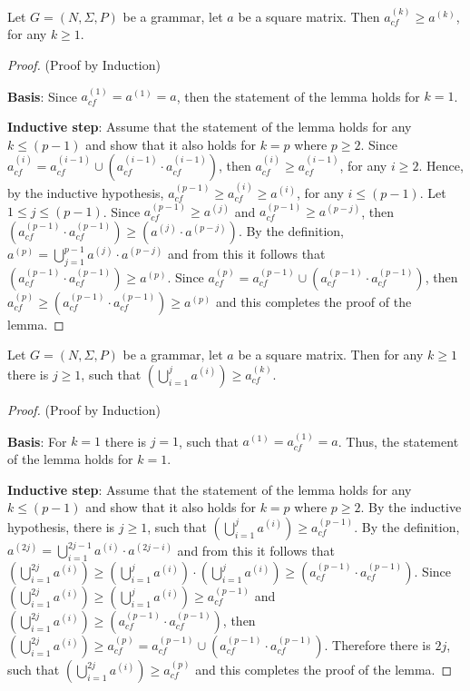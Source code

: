 \begin{lemma}\label{lemma:cf_geq_valiant}
	Let $G =(N,\Sigma,P)$ be a grammar, let $a$ be a square matrix. Then $a^{(k)}_{cf} \geq a^{(k)}$, for any $k \geq 1$.
\end{lemma}
\begin{proof}(Proof by Induction)
	
	\textbf{Basis}: Since $a^{(1)}_{cf} = a^{(1)} = a$, then the statement of the lemma holds for $k = 1$.
	
	\textbf{Inductive step}: Assume that the statement of the lemma holds for any $k \leq (p - 1)$ and show that it also holds for $k = p$ where $p \geq 2$. Since $a^{(i)}_{cf} = a^{(i-1)}_{cf} \cup (a^{(i-1)}_{cf} \cdot a^{(i-1)}_{cf})$, then $a^{(i)}_{cf} \geq a^{(i-1)}_{cf}$, for any $i \geq 2$. Hence, by the inductive hypothesis, $a^{(p-1)}_{cf} \geq a^{(i)}_{cf} \geq a^{(i)}$, for any $i \leq (p-1)$. Let $1 \leq j \leq (p - 1)$. Since $a^{(p-1)}_{cf} \geq a^{(j)}$ and $a^{(p-1)}_{cf} \geq a^{(p-j)}$, then $(a^{(p-1)}_{cf} \cdot a^{(p-1)}_{cf}) \geq (a^{(j)} \cdot a^{(p-j)})$. By the definition, $a^{(p)} = \bigcup^{p-1}_{j=1}{a^{(j)} \cdot a^{(p-j)}}$ and from this it follows that $(a^{(p-1)}_{cf} \cdot a^{(p-1)}_{cf}) \geq a^{(p)}$. Since $a^{(p)}_{cf} = a^{(p-1)}_{cf} \cup (a^{(p-1)}_{cf} \cdot a^{(p-1)}_{cf})$, then $a^{(p)}_{cf} \geq (a^{(p-1)}_{cf} \cdot a^{(p-1)}_{cf}) \geq a^{(p)}$ and this completes the proof of the lemma.
\end{proof}

\begin{lemma}\label{lemma:valiant_geq_cf}
	Let $G =(N,\Sigma,P)$ be a grammar, let $a$ be a square matrix. Then for any $k \geq 1$ there is $j \geq 1$, such that $(\bigcup^{j}_{i=1}{a^{(i)}}) \geq a^{(k)}_{cf}$.
\end{lemma}
\begin{proof}(Proof by Induction)
	
	\textbf{Basis}: For $k = 1$ there is $j = 1$, such that $a^{(1)} = a^{(1)}_{cf} = a$. Thus, the statement of the lemma holds for $k = 1$.
	
	\textbf{Inductive step}: Assume that the statement of the lemma holds for any $k \leq (p - 1)$ and show that it also holds for $k = p$ where $p \geq 2$. By the inductive hypothesis, there is $j \geq 1$, such that $(\bigcup^{j}_{i=1}{a^{(i)}}) \geq a^{(p-1)}_{cf}$. By the definition, $a^{(2j)} = \bigcup^{2j-1}_{i=1}{a^{(i)} \cdot a^{(2j-i)}}$ and from this it follows that $(\bigcup^{2j}_{i=1}{a^{(i)}}) \geq (\bigcup^{j}_{i=1}{a^{(i)}}) \cdot (\bigcup^{j}_{i=1}{a^{(i)}}) \geq (a^{(p-1)}_{cf} \cdot a^{(p-1)}_{cf})$. Since $(\bigcup^{2j}_{i=1}{a^{(i)}}) \geq (\bigcup^{j}_{i=1}{a^{(i)}}) \geq a^{(p-1)}_{cf}$ and $(\bigcup^{2j}_{i=1}{a^{(i)}}) \geq (a^{(p-1)}_{cf} \cdot a^{(p-1)}_{cf})$, then $(\bigcup^{2j}_{i=1}{a^{(i)}}) \geq a^{(p)}_{cf} = a^{(p-1)}_{cf} \cup (a^{(p-1)}_{cf} \cdot a^{(p-1)}_{cf})$. Therefore there is $2j$, such that $(\bigcup^{2j}_{i=1}{a^{(i)}}) \geq a^{(p)}_{cf}$ and this completes the proof of the lemma.	
\end{proof}

